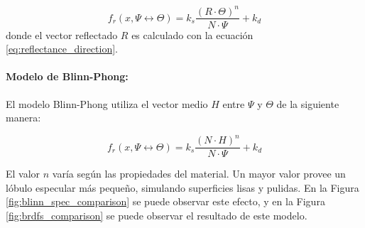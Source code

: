 \begin{equation}
    f_{r}(x, \Psi\leftrightarrow\Theta) = k_{s}\frac{(R\cdot \Theta)^n}{N\cdot\Psi} + k_{d}
    \label{eq:phong}
\end{equation} donde el vector reflectado $R$ es calculado con la ecuación \ref{eq:reflectance_direction}.

\paragraph{Modelo de Blinn-Phong:}
\label{para:blinn_phong}
El modelo Blinn-Phong utiliza el vector medio $H$ entre $\Psi$ y $\Theta$ de la siguiente manera:

\begin{equation}
    f_{r}(x, \Psi\leftrightarrow\Theta) = k_{s}\frac{(N\cdot H)^n}{N\cdot\Psi} + k_{d}
    \label{eq:blinn_phong_pr}
\end{equation}

El valor $n$ varía según las propiedades del material. Un mayor valor provee un lóbulo especular más pequeño, simulando superficies lisas y pulidas. En la Figura \ref{fig:blinn_spec_comparison} se puede observar este efecto, y en la Figura \ref{fig:brdfs_comparison} se puede observar el resultado de este modelo.

